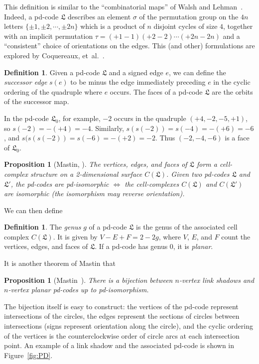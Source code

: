 \documentclass[amsmath,secnumarabic,amssymb,floatfix,nofootinbib,nobibnotes,letterpaper,11pt,tightenlines,showkeys]{revtex4}
\newtheorem{proposition}[theorem]{Proposition}
\theoremstyle{definition}
\newtheorem{definition}[theorem]{Definition}
\begin{document}
This definition is similar to the ``combinatorial maps'' of Walsh and Lehman~\cite{Walsh:1972ti}. Indeed, a pd-code $\mathfrak{L}$ describes an element $\sigma$ of the permutation group on the $4n$ letters $\{\pm1,\pm2,\cdots,\pm2n\}$ which is a product of $n$ disjoint cycles of size $4$, together with an implicit permutation $\tau = (+1 -1)(+2 -2)\cdots(+2n -2n)$ and a ``consistent'' choice of orientations on the edges. This (and other) formulations are explored by Coquereaux, et\ al.~\cite{Coquereaux:2015wv}.
\begin{definition}
Given a pd-code $\mathfrak{L}$ and a signed edge $e$, we can define the \emph{successor edge} $s(e)$ to be minus the edge immediately preceding $e$ in the cyclic ordering of the quadruple where $e$ occurs. The faces of a pd-code $\mathfrak{L}$ are the orbits of the successor map.
\end{definition}
In the pd-code $\mathfrak{L}_0$, for example, $-2$ occurs in the quadruple $(+4,-2,-5,+1)$, so $s(-2) = -(+4) = -4$. Similarly, $s(s(-2)) = s(-4) = -(+6) = -6$, and $s(s(s(-2)) = s(-6) = -(+2) = -2$. Thus $(-2,-4,-6)$ is a face of $\mathfrak{L}_0$.
\begin{proposition}[Mastin, \cite{Mastin:2015ii}]
The vertices, edges, and faces of $\mathfrak{L}$ form a cell-complex structure on a 2-dimensional surface $C(\mathfrak{L})$. Given two pd-codes $\mathfrak{L}$ and $\mathfrak{L'}$, the pd-codes are pd-isomorphic $\iff$ the cell-complexes $C(\mathfrak{L})$ and $C(\mathfrak{L}')$ are isomorphic (the isomorphism may reverse orientation).
\end{proposition}
We can then define
\begin{definition}
The \emph{genus} $g$ of a pd-code $\mathfrak{L}$ is the genus of the associated cell complex $C(\mathfrak{L})$. It is given by $V - E + F = 2 - 2g$, where $V$, $E$, and $F$ count the vertices, edges, and faces of $\mathfrak{L}$. If a pd-code has genus 0, it is \emph{planar}.
\end{definition}
It is another theorem of Mastin that
\begin{proposition}[Mastin~\cite{Mastin:2015ii}]
There is a bijection between $n$-vertex link shadows and $n$-vertex \emph{planar} pd-codes up to pd-isomorphism.
\end{proposition}
The bijection itself is easy to construct: the vertices of the pd-code represent intersections of the circles, the edges represent the sections of circles between intersections (signs represent orientation along the circle), and the cyclic ordering of the vertices is the counterclockwise order of circle arcs at each intersection point. An example of a link shadow and the associated pd-code is shown in Figure~\ref{fig:PD}.
\end{document}
